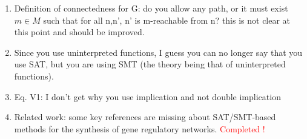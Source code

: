\documentclass{llncs}
\begin{document}
\begin{enumerate}
\item Definition of connectedness for G: do you allow any path, or it must exist $m \in M$ such that for all n,n', n' is m-reachable from n? this is not clear at this point
and should be improved. \newline
{\color{red}{done.}}\\


\item Since you use uninterpreted functions, I guess you can no longer say that you use
SAT,  but you are using SMT (the theory being that of uninterpreted functions).\newline
{\color{red}{Ankit will replace everywhere from SAT to SMT}}\\

\item Eq. V1: I don't get why you use implication and not double implication \newline
{\color{red}{Ashutosh. needs thinking?? }}\\

\item Related work: some key references are missing about SAT/SMT-based methods for the
synthesis of gene regulatory networks.\newline
\textcolor{red}{Completed !}
\end{enumerate}
\end{document}

